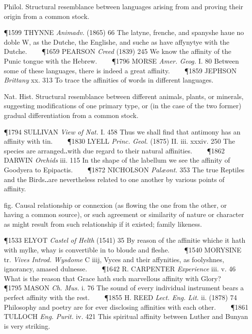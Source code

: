 \begin{description}[wide, labelwidth=!, labelindent=0pt]
\begin{myenumerate}
 Philol. Structural resemblance between languages arising from and proving their origin from a common stock. 

\P 1599 THYNNE \textit{Animadv.} (1865) 66 The latyne, frenche, and spanyshe haue no doble W, as the Dutche, the Englishe, and suche as have affynytye with the Dutche.    
\P 1659 PEARSON \textit{Creed} (1839) 245 We know the affinity of the Punic tongue with the Hebrew.    
\P 1796 MORSE \textit{Amer. Geog.} I. 80 Between some of these languages, there is indeed a great affinity.    
\P 1859 JEPHSON \textit{Brittany} xx. 313 To trace the affinities of words in different languages.

 Nat. Hist. Structural resemblance between different animals, plants, or minerals, suggesting modifications of one primary type, or (in the case of the two former) gradual differentiation from a common stock. 

\P 1794 SULLIVAN \textit{View of Nat.} I. 458 Thus we shall find that antimony has an affinity with tin.    
\P 1830 LYELL \textit{Princ. Geol.} (1875) II. iii. xxxiv. 250 The species are arranged‥with due regard to their natural affinities.    
\P 1862 DARWIN \textit{Orchids} iii. 115 In the shape of the labellum we see the affinity of Goodyera to Epipactis.    
\P 1872 NICHOLSON \textit{Palæont.} 353 The true Reptiles and the Birds‥are nevertheless related to one another by various points of affinity.

 fig. Causal relationship or connexion (as flowing the one from the other, or having a common source), or such agreement or similarity of nature or character as might result from such relationship if it existed; family likeness. 

\P 1533 ELYOT \textit{Castel of Helth} (1541) 35 By reason of the affinitie whiche it hath with mylke, whay is convertible in to bloude and fleshe.    
\P 1540 MORYSINE tr. \textit{Vives Introd. Wysdome} C iiij, Vyces and their affynities, as foolyshnes, ignorancy, amased dulnesse.    
\P 1642 R. CARPENTER \textit{Experience} iii. v. 46 What is the reason that Grace hath such marvellous affinity with Glory?    
\P 1795 MASON \textit{Ch. Mus.} i. 76 The sound of every individual instrument bears a perfect affinity with the rest.    
\P 1855 H. REED \textit{Lect. Eng. Lit.} ii. (1878) 74 Philosophy and poetry are for ever disclosing affinities with each other.    
\P 1861 TULLOCH \textit{Eng. Purit.} iv. 421 This spiritual affinity between Luther and Bunyan is very striking.


\end{myenumerate}
\end{description}
